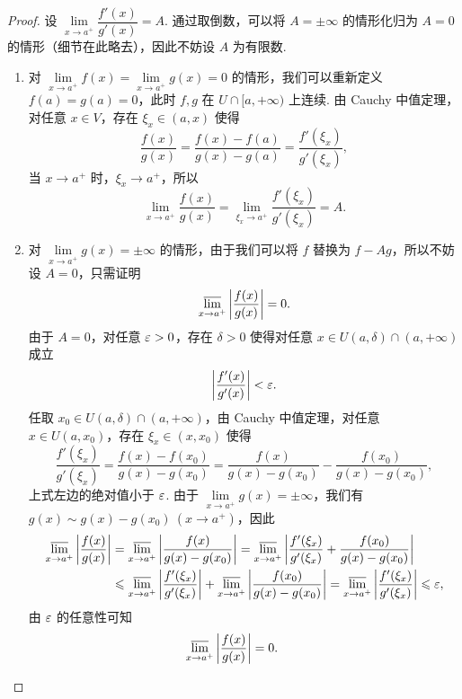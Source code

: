 \documentclass[../main.tex]{subfiles}
\begin{document}
\begin{proof}
    设 $\lim\limits_{x \to a^+} \dfrac{f'(x)}{g'(x)} = A$. 通过取倒数，可以将 $A = \pm\infty$ 的情形化归为 $A = 0$ 的情形（细节在此略去），因此不妨设 $A$ 为有限数. 
    \begin{enumerate}[label = (\arabic*)]
        \item 对 $\lim\limits_{x \to a^+} f(x) = \lim\limits_{x \to a^+} g(x) = 0$ 的情形，我们可以重新定义 $f(a) = g(a) = 0$，此时 $f, g$ 在 $U \cap [a, +\infty)$ 上连续. 由 Cauchy 中值定理，对任意 $x \in V$，存在 $\xi_x \in (a, x)$ 使得 
        $$
        \frac{f(x)}{g(x)} = \frac{f(x) - f(a)}{g(x) - g(a)} = \frac{f'(\xi_x)}{g'(\xi_x)}, 
        $$
        当 $x \to a^+$ 时，$\xi_x \to a^+$，所以
        $$
        \lim_{x \to a^+} \frac{f(x)}{g(x)} = \lim_{\xi_x \to a^+} \frac{f'(\xi_x)}{g'(\xi_x)} = A. 
        $$

        \item 对 $\lim\limits_{x \to a^+} g(x) = \pm\infty$ 的情形，由于我们可以将 $f$ 替换为 $f - Ag$，所以不妨设 $A = 0$，只需证明
        $$
        \varlimsup_{x \to a^+} \bigg| \frac{f(x)}{g(x)} \bigg| = 0. 
        $$
        由于 $A = 0$，对任意 $\varepsilon > 0$，存在 $\delta > 0$ 使得对任意 $x \in U(a, \delta) \cap (a, +\infty)$ 成立
        $$
        \bigg| \frac{f'(x)}{g'(x)} \bigg| < \varepsilon. 
        $$
        任取 $x_0 \in U(a, \delta) \cap (a, +\infty)$，由 Cauchy 中值定理，对任意 $x \in U(a, x_0)$，存在 $\xi_x \in (x, x_0)$ 使得
        $$
        \frac{f'(\xi_x)}{g'(\xi_x)} = \frac{f(x) - f(x_0)}{g(x) - g(x_0)} = \frac{f(x)}{g(x) - g(x_0)} - \frac{f(x_0)}{g(x) - g(x_0)}, 
        $$
        上式左边的绝对值小于 $\varepsilon$. 由于 $\lim\limits_{x \to a^+} g(x) = \pm\infty$，我们有 $g(x) \sim g(x) - g(x_0)\ (x \to a^+)$，因此
        \begin{align*}
            \varlimsup_{x \to a^+} \bigg| \frac{f(x)}{g(x)} \bigg| &= \varlimsup_{x \to a^+} \bigg| \frac{f(x)}{g(x) - g(x_0)} \bigg| 
            = \varlimsup_{x \to a^+} \bigg| \frac{f'(\xi_x)}{g'(\xi_x)} + \frac{f(x_0)}{g(x) - g(x_0)} \bigg| \\
            &\leqslant \varlimsup_{x \to a^+} \bigg| \frac{f'(\xi_x)}{g'(\xi_x)} \bigg| + \varlimsup_{x \to a^+} \bigg| \frac{f(x_0)}{g(x) - g(x_0)} \bigg| 
            = \varlimsup_{x \to a^+} \bigg| \frac{f'(\xi_x)}{g'(\xi_x)} \bigg|
            \leqslant \varepsilon, 
        \end{align*} 
        由 $\varepsilon$ 的任意性可知 
        \begin{equation*}
            \varlimsup_{x \to a^+} \bigg| \frac{f(x)}{g(x)} \bigg| = 0. \tag*{\qedhere}
        \end{equation*}
    \end{enumerate}
\end{proof}
\end{document}
